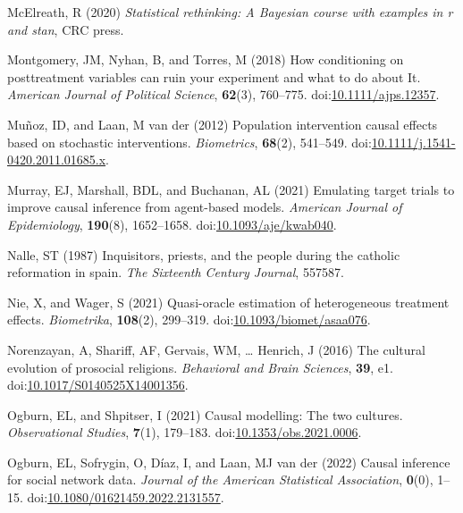 \documentclass[
  singlecolumn]{article}
\newlength{\cslhangindent}
\newenvironment{CSLReferences}[2] %
 {\begin{list}{}{%
  \setlength{\itemindent}{0pt}
  \setlength{\leftmargin}{0pt}
  \setlength{\parsep}{0pt}
  \ifodd #1
   \setlength{\leftmargin}{\cslhangindent}
   \setlength{\itemindent}{-1\cslhangindent}
  \fi
  \setlength{\itemsep}{#2\baselineskip}}}
 {\end{list}}
\begin{document}
\begin{CSLReferences}{1}{0}
McElreath, R (2020) \emph{Statistical rethinking: A {B}ayesian course
with examples in r and stan}, CRC press.

Montgomery, JM, Nyhan, B, and Torres, M (2018) How conditioning on
posttreatment variables can ruin your experiment and what to do about
It. \emph{American Journal of Political Science}, \textbf{62}(3),
760--775.
doi:\href{https://doi.org/10.1111/ajps.12357}{10.1111/ajps.12357}.

Muñoz, ID, and Laan, M van der (2012) Population intervention causal
effects based on stochastic interventions. \emph{Biometrics},
\textbf{68}(2), 541--549.
doi:\href{https://doi.org/10.1111/j.1541-0420.2011.01685.x}{10.1111/j.1541-0420.2011.01685.x}.

Murray, EJ, Marshall, BDL, and Buchanan, AL (2021) Emulating target
trials to improve causal inference from agent-based models.
\emph{American Journal of Epidemiology}, \textbf{190}(8), 1652--1658.
doi:\href{https://doi.org/10.1093/aje/kwab040}{10.1093/aje/kwab040}.

Nalle, ST (1987) Inquisitors, priests, and the people during the
catholic reformation in spain. \emph{The Sixteenth Century Journal},
557587.

Nie, X, and Wager, S (2021) Quasi-oracle estimation of heterogeneous
treatment effects. \emph{Biometrika}, \textbf{108}(2), 299--319.
doi:\href{https://doi.org/10.1093/biomet/asaa076}{10.1093/biomet/asaa076}.

Norenzayan, A, Shariff, AF, Gervais, WM, \ldots{} Henrich, J (2016) The
cultural evolution of prosocial religions. \emph{Behavioral and Brain
Sciences}, \textbf{39}, e1.
doi:\href{https://doi.org/10.1017/S0140525X14001356}{10.1017/S0140525X14001356}.

Ogburn, EL, and Shpitser, I (2021) Causal modelling: The two cultures.
\emph{Observational Studies}, \textbf{7}(1), 179--183.
doi:\href{https://doi.org/10.1353/obs.2021.0006}{10.1353/obs.2021.0006}.

Ogburn, EL, Sofrygin, O, Díaz, I, and Laan, MJ van der (2022) Causal
inference for social network data. \emph{Journal of the American
Statistical Association}, \textbf{0}(0), 1--15.
doi:\href{https://doi.org/10.1080/01621459.2022.2131557}{10.1080/01621459.2022.2131557}.


\end{CSLReferences}
\end{document}
